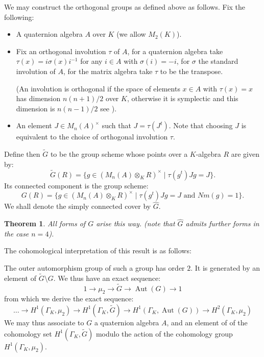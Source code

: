 \documentclass{article}
\theoremstyle{plain}
\newtheorem{theorem}{Theorem}[section]
\theoremstyle{definition}
\numberwithin{equation}{section}
\DeclareMathOperator{\Aut}{Aut}
\newcommand{\GalKbK}{\Gamma_K}
\begin{document}
We may construct the orthogonal groups as defined above as follows. Fix the following:
\begin{itemize}
\item A quaternion algebra $A$ over $K$ (we allow $M_2(K)$).
\item Fix an orthogonal involution $\tau$ of $A$, for a quaternion algebra take $\tau(x) = i\sigma(x)i^{-1}$ for any $i\in A$ with $\sigma(i) = -i$, for $\sigma$ the standard involution of $A$, for the matrix algebra take $\tau$ to be the transpose.

(An involution is orthogonal if the space of elements $x\in A$ with $\tau(x) = x$ has dimension $n(n+1)/2$ over $K$, otherwise it is symplectic and this dimension is $n(n-1)/2$ see \cite[2.6]{TODO the book of involutions}).
\item An element $J \in M_{n}(A)^\times$ such that $J = \tau(J^t)$.
Note that choosing $J$ is equivalent to the choice of orthogonal involution $\tau$.
\end{itemize}
Define then $\tilde{G}$ to be the group scheme whose points over a $K$-algebra $R$ are given by:
\[ \tilde{G}(R) = \{ g\in (M_{n}(A) \otimes_K R)^\times \mid \tau(g^t)Jg = J  \}. \]
Its connected component is the group scheme:
\[ G(R) = \{ g\in (M_{n}(A) \otimes_K R)^\times \mid \tau(g^t)Jg = J  \text{ and } Nm(g) = 1 \}. \]
We shall denote the simply connected cover by $\hat{G}$.

\begin{theorem}
All forms of $G$ arise this way. (note that $\hat{G}$ admits further forms in the case $n=4$).
\end{theorem}
\cite[TODO]{book of involutions}


The cohomological interpretation of this result is as follows:

The outer automorphism group of such a group has order $2$.
It is generated by an element of $\tilde{G}\setminus G$.
We thus have an exact sequence:
\[ 1 \rightarrow \mu_2 \rightarrow \tilde{G} \rightarrow \Aut(G) \rightarrow 1 \]
from which we derive the exact sequence:
\[\ldots \rightarrow H^1(\GalKbK,\mu_2) \rightarrow  H^1(\GalKbK, \tilde{G})  \rightarrow  H^1(\GalKbK, \Aut(G)) \rightarrow  H^2(\GalKbK, \mu_2)  \]
We may thus associate to $G$ a quaternion algebra $A$, and an element of of the cohomology set $H^1(\GalKbK, \tilde{G})$ modulo the action of the cohomology group $H^1(\GalKbK,\mu_2)$.
\end{document}
